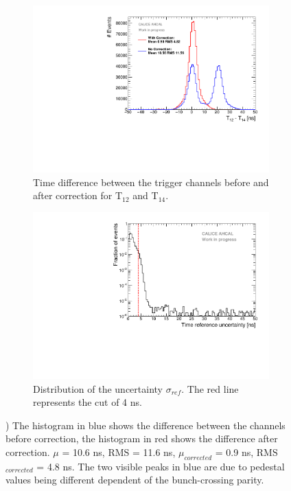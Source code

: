 \begin{figure}[htbp!]
	\begin{subfigure}[t]{0.5\textwidth}
		\centering
		\includegraphics[width=1\textwidth]{../Thesis_Plots/Timing/T0s/Plots/T0_Resolution_5.pdf}
		\caption{Time difference between the trigger channels before and after correction for T$_{12}$ and T$_{14}$.}	\label{fig:T0_Correction}
	\end{subfigure}
	\hfill
	\begin{subfigure}[t]{0.5\textwidth}
		\centering
		\includegraphics[width=1\linewidth]{../Thesis_Plots/Timing/T0s/Plots/T0ReferenceError}
		\caption{Distribution of the uncertainty $\sigma_{ref}$. The red line represents the cut of 4 ns.} \label{fig:T0ReferenceError}
	\end{subfigure}
	\caption{) The histogram in blue shows the difference between the channels before correction, the histogram in red shows the difference after correction. $\mu$ = 10.6 ns, RMS = 11.6 ns, $\mu_{corrected}$ = 0.9 ns, RMS$_{corrected}$ = 4.8 ns. The two visible peaks in blue are due to pedestal values being different dependent of the bunch-crossing parity. }
\end{figure}

